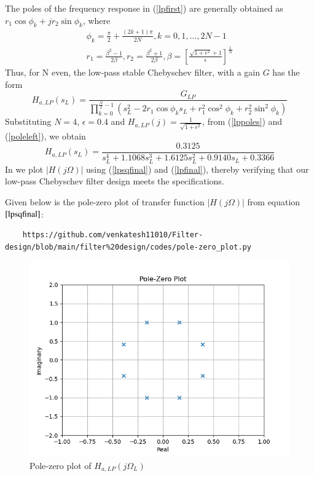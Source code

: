 \documentclass{article}
\begin{document}
\begin{enumerate}
The poles of the frequency response in (\ref{lpfirst}) are generally obtained as 
$r_1\cos\phi_k + jr_2\sin \phi_k$, where
\begin{eqnarray}
\label{lppoles}
\phi_k = \frac{\pi}{2} + \frac{(2k+1)\pi}{2N}, k = 0, 1, \dots, 2N-1 \nonumber \\
r_1 = \frac{\beta^2 - 1}{2\beta}, r_2 = \frac{\beta^2 + 1}{2\beta}, \beta = \left[ \frac{\sqrt{1 + \epsilon^2} + 1}{\epsilon}\right]^{\frac{1}{N}}
\end{eqnarray}
Thus, for N even, the low-pass stable Chebyschev filter, with a gain $G$ has the form
\begin{equation}
\label{poleleft}
H_{a,LP}(s_L) = \frac{G_{LP}}{\prod_{k = 0}^{\frac{N}{2}-1}(s_L^2 - 2r_1\cos\phi_ks_L + r_1^2\cos^2\phi_k + r_2^2 \sin^2\phi_k)}
\end{equation}
Substituting $N = 4$, $\epsilon = 0.4$ and $H_{a,LP}(j) = \frac{1}{\sqrt{1+\epsilon^2}}$, from (\ref{lppoles}) and (\ref{poleleft}), we obtain 
\begin{equation}
\label{lpfinal}
H_{a,LP}(s_L) = \frac{0.3125}{s_L^4 + 1.1068s_L^3 + 1.6125s_L^2+0.9140s_L + 0.3366}
\end{equation}
In  we plot $|H(j\Omega)|$ using (\ref{lpsqfinal}) and (\ref{lpfinal}), thereby verifying that our low-pass Chebyschev filter design meets the specifications.

Given below is the pole-zero plot of transfer function $|H(j\Omega)|$ from equation$\eqref{lpsqfinal}$:
\begin{lstlisting}
	https://github.com/venkatesh11010/Filter-design/blob/main/filter%20design/codes/pole-zero_plot.py
\end{lstlisting}

\begin{figure}[H]
\includegraphics[width = \columnwidth]{figs/pole_zero.png}
\caption{Pole-zero plot of $H_{a,LP}(j\Omega_L)$}
\label{fig1}
\end{figure}


\end{enumerate}
\end{document}
